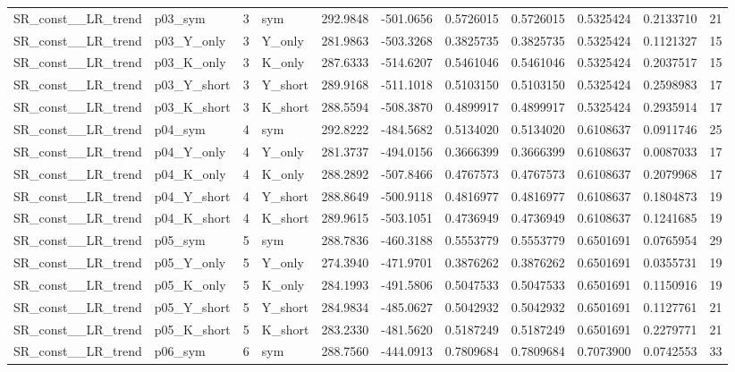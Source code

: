 \begin{table}[!h]
\begin{tabular}[t]{llrlrrrrrrr}
\addlinespace
SR\_const\_\_LR\_trend & p03\_sym & 3 & sym & 292.9848 & -501.0656 & 0.5726015 & 0.5726015 & 0.5325424 & 0.2133710 & 21\\
SR\_const\_\_LR\_trend & p03\_Y\_only & 3 & Y\_only & 281.9863 & -503.3268 & 0.3825735 & 0.3825735 & 0.5325424 & 0.1121327 & 15\\
SR\_const\_\_LR\_trend & p03\_K\_only & 3 & K\_only & 287.6333 & -514.6207 & 0.5461046 & 0.5461046 & 0.5325424 & 0.2037517 & 15\\
SR\_const\_\_LR\_trend & p03\_Y\_short & 3 & Y\_short & 289.9168 & -511.1018 & 0.5103150 & 0.5103150 & 0.5325424 & 0.2598983 & 17\\
SR\_const\_\_LR\_trend & p03\_K\_short & 3 & K\_short & 288.5594 & -508.3870 & 0.4899917 & 0.4899917 & 0.5325424 & 0.2935914 & 17\\
\addlinespace
SR\_const\_\_LR\_trend & p04\_sym & 4 & sym & 292.8222 & -484.5682 & 0.5134020 & 0.5134020 & 0.6108637 & 0.0911746 & 25\\
SR\_const\_\_LR\_trend & p04\_Y\_only & 4 & Y\_only & 281.3737 & -494.0156 & 0.3666399 & 0.3666399 & 0.6108637 & 0.0087033 & 17\\
SR\_const\_\_LR\_trend & p04\_K\_only & 4 & K\_only & 288.2892 & -507.8466 & 0.4767573 & 0.4767573 & 0.6108637 & 0.2079968 & 17\\
SR\_const\_\_LR\_trend & p04\_Y\_short & 4 & Y\_short & 288.8649 & -500.9118 & 0.4816977 & 0.4816977 & 0.6108637 & 0.1804873 & 19\\
SR\_const\_\_LR\_trend & p04\_K\_short & 4 & K\_short & 289.9615 & -503.1051 & 0.4736949 & 0.4736949 & 0.6108637 & 0.1241685 & 19\\
\addlinespace
SR\_const\_\_LR\_trend & p05\_sym & 5 & sym & 288.7836 & -460.3188 & 0.5553779 & 0.5553779 & 0.6501691 & 0.0765954 & 29\\
SR\_const\_\_LR\_trend & p05\_Y\_only & 5 & Y\_only & 274.3940 & -471.9701 & 0.3876262 & 0.3876262 & 0.6501691 & 0.0355731 & 19\\
SR\_const\_\_LR\_trend & p05\_K\_only & 5 & K\_only & 284.1993 & -491.5806 & 0.5047533 & 0.5047533 & 0.6501691 & 0.1150916 & 19\\
SR\_const\_\_LR\_trend & p05\_Y\_short & 5 & Y\_short & 284.9834 & -485.0627 & 0.5042932 & 0.5042932 & 0.6501691 & 0.1127761 & 21\\
SR\_const\_\_LR\_trend & p05\_K\_short & 5 & K\_short & 283.2330 & -481.5620 & 0.5187249 & 0.5187249 & 0.6501691 & 0.2279771 & 21\\
\addlinespace
SR\_const\_\_LR\_trend & p06\_sym & 6 & sym & 288.7560 & -444.0913 & 0.7809684 & 0.7809684 & 0.7073900 & 0.0742553 & 33\\

\end{tabular}
\end{table}
